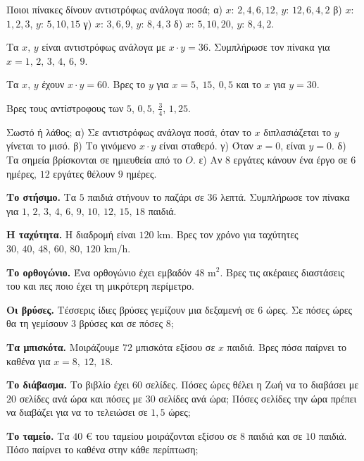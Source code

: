 

\ex Ποιοι πίνακες δίνουν αντιστρόφως ανάλογα ποσά; α) $x$: $2,4,6,12$, $y$: $12,6,4,2$ \quad β) $x$: $1,2,3$, $y$: $5,10,15$ \quad γ) $x$: $3,6,9$, $y$: $8,4,3$ \quad δ) $x$: $5,10,20$, $y$: $8,4,2$.

\ex Τα $x,\,y$ είναι αντιστρόφως ανάλογα με $x\cdot y=36$. Συμπλήρωσε τον πίνακα για $x=1,\,2,\,3,\,4,\,6,\,9$.

\ex Τα $x,\,y$ έχουν $x\cdot y=60$. Βρες το $y$ για $x=5,\ 15,\ 0{,}5$ και το $x$ για $y=30$.

\ex Βρες τους αντίστροφους των $5$, $0{,}5$, $\frac{3}{4}$, $1{,}25$.

\ex Σωστό ή λάθος; α) Σε αντιστρόφως ανάλογα ποσά, όταν το $x$ διπλασιάζεται το $y$ γίνεται το μισό. \quad β) Το γινόμενο $x\cdot y$ είναι σταθερό. \quad γ) Όταν $x=0$, είναι $y=0$. \quad δ) Τα σημεία βρίσκονται σε ημιευθεία από το $O$. \quad ε) Αν $8$ εργάτες κάνουν ένα έργο σε $6$ ημέρες, $12$ εργάτες θέλουν $9$ ημέρες.


\ex \textbf{Το στήσιμο.} Τα $5$ παιδιά στήνουν το παζάρι σε $36$ λεπτά. Συμπλήρωσε τον πίνακα για $1,\,2,\,3,\,4,\,6,\,9,\,10,\,12,\,15,\,18$ παιδιά.

\ex \textbf{Η ταχύτητα.} Η διαδρομή είναι $120$ km. Βρες τον χρόνο για ταχύτητες $30,\,40,\,48,\,60,\,80,\,120$ km/h.

\ex \textbf{Το ορθογώνιο.} Ένα ορθογώνιο έχει εμβαδόν $48$ m$^2$. Βρες τις ακέραιες διαστάσεις του και πες ποιο έχει τη μικρότερη περίμετρο.

\ex \textbf{Οι βρύσες.} Τέσσερις ίδιες βρύσες γεμίζουν μια δεξαμενή σε $6$ ώρες. Σε πόσες ώρες θα τη γεμίσουν $3$ βρύσες και σε πόσες $8$;

\ex \textbf{Τα μπισκότα.} Μοιράζουμε $72$ μπισκότα εξίσου σε $x$ παιδιά. Βρες πόσα παίρνει το καθένα για $x=8,\ 12,\ 18$.

\ex \textbf{Το διάβασμα.} Το βιβλίο έχει $60$ σελίδες. Πόσες ώρες θέλει η Ζωή να το διαβάσει με $20$ σελίδες ανά ώρα και πόσες με $30$ σελίδες ανά ώρα; Πόσες σελίδες την ώρα πρέπει να διαβάζει για να το τελειώσει σε $1{,}5$ ώρες;

\ex \textbf{Το ταμείο.} Τα $40$ € του ταμείου μοιράζονται εξίσου σε $8$ παιδιά και σε $10$ παιδιά. Πόσο παίρνει το καθένα στην κάθε περίπτωση;



